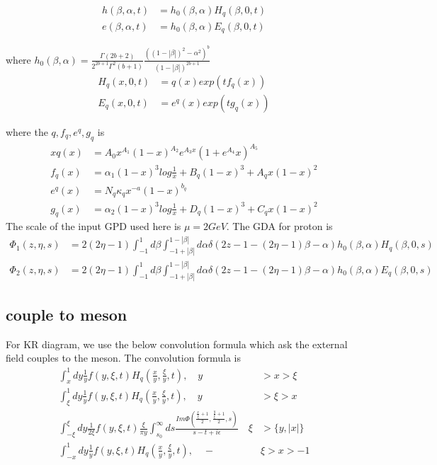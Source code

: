 \documentclass[preprintnumbers,prd,superscriptaddress,preprint]{revtex4-1}
\begin{document}
	\begin{align*}
		h(\beta,\alpha,t) & =h_{0}(\beta,\alpha)H_{q}(\beta,0,t)\\
		e(\beta,\alpha,t) & =h_{0}(\beta,\alpha)E_{q}(\beta,0,t)
	\end{align*}
	
	where $h_{0}(\beta,\alpha)=\frac{\Gamma(2b+2)}{2^{2b+1}\Gamma^{2}(b+1)}\frac{((1-|\beta|)^{2}-\alpha^{2})^{b}}{(1-|\beta|)^{2b+1}}$
	\begin{align*}
		H_{q}(x,0,t) & =q(x)exp(tf_{q}(x))\\
		E_{q}(x,0,t) & =e^{q}(x)exp(tg_{q}(x))
	\end{align*}
	
	where the $q,f_{q},e^{q},g_{q}$ is 
	\begin{align*}
		xq(x) & =A_{0}x^{A_{1}}(1-x)^{A_{2}}e^{A_{3}x}(1+e^{A_{4}}x)^{A_{5}}\\
		f_{q}(x) & =\alpha_{1}(1-x)^{3}log\frac{1}{x}+B_{q}(1-x)^{3}+A_{q}x(1-x)^{2}\\
		e^{q}(x) & =N_{q}\kappa_{q}x^{-a}(1-x)^{b_{q}}\\
		g_{q}(x) & =\alpha_{2}(1-x)^{3}log\frac{1}{x}+D_{q}(1-x)^{3}+C_{q}x(1-x)^{2}
	\end{align*}
	The scale of the input GPD used here is $\mu=2 GeV$. 
	The GDA for proton is
	\begin{align*}
		\Phi_{1}(z,\eta,s) & =2(2\eta-1)\int_{-1}^{1}d\beta\int_{-1+|\beta|}^{1-|\beta|}d\alpha\delta(2z-1-(2\eta-1)\beta-\alpha)h_{0}(\beta,\alpha)H_{q}(\beta,0,s)\\
		\Phi_{2}(z,\eta,s) & =2(2\eta-1)\int_{-1}^{1}d\beta\int_{-1+|\beta|}^{1-|\beta|}d\alpha\delta(2z-1-(2\eta-1)\beta-\alpha)h_{0}(\beta,\alpha)E_{q}(\beta,0,s)
	\end{align*}
	
	
	\subsection{couple to meson}
	
	For KR diagram, we use the below convolution formula which ask the
	external field couples to the meson. The convolution formula is 
	\begin{align*}
		\int_{x}^{1}dy\frac{1}{y}f(y,\xi,t)H_{q}(\frac{x}{y},\frac{\xi}{y},t),\quad y & >x>\xi\\
		\int_{\xi}^{1}dy\frac{1}{y}f(y,\xi,t)H_{q}(\frac{x}{y},\frac{\xi}{y},t),\quad y & >\xi>x\\
		\int_{-\xi}^{\xi}dy\frac{1}{2\xi}f(y,\xi,t)\frac{\xi}{\pi y}\int_{s_{0}}^{\infty}ds\frac{Im\Phi(\frac{\frac{x}{\xi}+1}{2},\frac{\frac{y}{\xi}+1}{2},s)}{s-t+i\epsilon}\quad\xi & >\{y,|x|\}\\
		\int_{-x}^{1}dy\frac{1}{y}f(y,\xi,t)H_{q}(\frac{x}{y},\frac{\xi}{y},t),\quad- & \xi>x>-1
	\end{align*}
	
\end{document}

